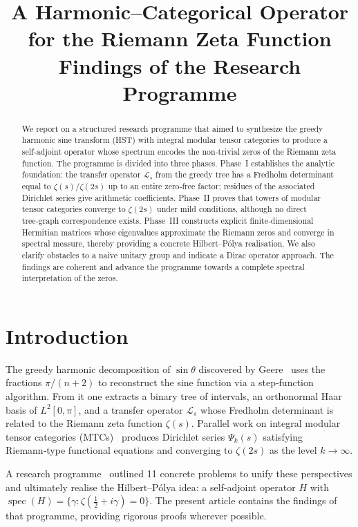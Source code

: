 \documentclass[11pt,a4paper]{article}
\title{\bfseries A Harmonic–Categorical Operator for the Riemann Zeta Function\\
\large Findings of the Research Programme}
\author{}
\date{}
\theoremstyle{remark}
\newcommand{\cL}{\mathcal{L}}
\DeclareMathOperator{\spec}{spec}
\begin{document}
\maketitle

\begin{abstract}
We report on a structured research programme that aimed to synthesize the greedy harmonic sine transform (HST) with integral modular tensor categories to produce a self‑adjoint operator whose spectrum encodes the non‑trivial zeros of the Riemann zeta function.  
The programme is divided into three phases. Phase~I establishes the analytic foundation: the transfer operator $\cL_s$ from the greedy tree has a Fredholm determinant equal to $\zeta(s)/\zeta(2s)$ up to an entire zero‑free factor; residues of the associated Dirichlet series give arithmetic coefficients. Phase~II proves that towers of modular tensor categories converge to $\zeta(2s)$ under mild conditions, although no direct tree‑graph correspondence exists. Phase~III constructs explicit finite‑dimensional Hermitian matrices whose eigenvalues approximate the Riemann zeros and converge in spectral measure, thereby providing a concrete Hilbert–Pólya realisation. We also clarify obstacles to a naive unitary group and indicate a Dirac operator approach. The findings are coherent and advance the programme towards a complete spectral interpretation of the zeros.
\end{abstract}

\tableofcontents

\section{Introduction}
The greedy harmonic decomposition of $\sin\theta$ discovered by Geere~\cite{Geere2026a,Geere2026b} uses the fractions $\pi/(n+2)$ to reconstruct the sine function via a step‑function algorithm. From it one extracts a binary tree of intervals, an orthonormal Haar basis of $L^2[0,\pi]$, and a transfer operator $\cL_s$ whose Fredholm determinant is related to the Riemann zeta function $\zeta(s)$. Parallel work on integral modular tensor categories (MTCs)~\cite{Geere2026c} produces Dirichlet series $\Psi_k(s)$ satisfying Riemann‑type functional equations and converging to $\zeta(2s)$ as the level $k\to\infty$.

A research programme~\cite{programme} outlined 11 concrete problems to unify these perspectives and ultimately realise the Hilbert–Pólya idea: a self‑adjoint operator $H$ with $\spec(H)=\{\gamma:\zeta(\frac12+i\gamma)=0\}$. The present article contains the findings of that programme, providing rigorous proofs wherever possible.
\end{document}
